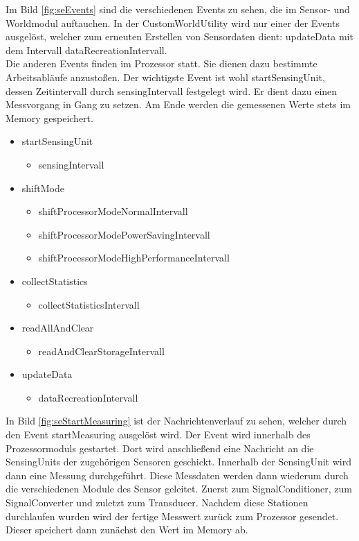 Im Bild \ref{fig:seEvents} sind die verschiedenen Events zu sehen, die im Sensor- und Worldmodul auftauchen. In der CustomWorldUtility wird nur einer der Events ausgelöst, welcher zum erneuten Erstellen von Sensordaten dient: updateData mit dem Intervall dataRecreationIntervall.\\
Die anderen Events finden im Prozessor statt. Sie dienen dazu bestimmte Arbeitsabläufe anzustoßen. Der wichtigste Event ist wohl startSensingUnit, dessen Zeitintervall durch sensingIntervall festgelegt wird. Er dient dazu einen Messvorgang in Gang zu setzen. Am Ende werden die gemessenen Werte stets im Memory gespeichert.

\begin{itemize}
\item startSensingUnit
\begin{itemize}
\item sensingIntervall
\end{itemize}
\item shiftMode
\begin{itemize}
\item shiftProcessorModeNormalIntervall
\item shiftProcessorModePowerSavingIntervall
\item shiftProcessorModeHighPerformanceIntervall
\end{itemize}
\item collectStatistics
\begin{itemize}
\item collectStatisticsIntervall
\end{itemize}
\item readAllAndClear
\begin{itemize}
\item readAndClearStorageIntervall
\end{itemize}
\item updateData
\begin{itemize}
\item dataRecreationIntervall
\end{itemize}
\end{itemize}

In Bild \ref{fig:seStartMeasuring} ist der Nachrichtenverlauf zu sehen, welcher durch den Event startMeasuring ausgelöst wird. Der Event wird innerhalb des Prozessormoduls gestartet. Dort wird anschließend eine Nachricht an die SensingUnits der zugehörigen Sensoren geschickt. Innerhalb der SensingUnit wird dann eine Messung durchgeführt. Diese Messdaten werden dann wiederum durch die verschiedenen Module des Sensor geleitet. Zuerst zum SignalConditioner, zum SignalConverter und zuletzt zum Transducer. Nachdem diese Stationen durchlaufen wurden wird der fertige Messwert zurück zum Prozessor gesendet. Dieser speichert dann zunächst den Wert im Memory ab.

